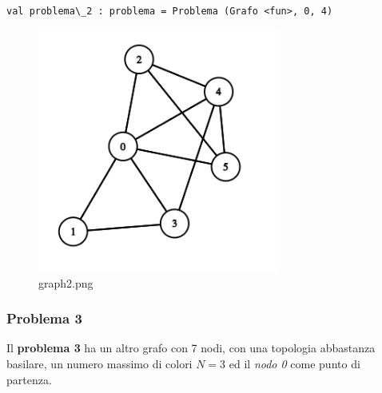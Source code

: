 \documentclass[11pt]{article}
\makeatletter
\newcommand{\boxspacing}{\kern\kvtcb@left@rule\kern\kvtcb@boxsep}
\newcommand{\prompt}[4]{
        {\ttfamily\llap{{\color{#2}[#3]:\hspace{3pt}#4}}\vspace{-\baselineskip}}
    }
\makeatother
\begin{document}
            \begin{tcolorbox}[breakable, size=fbox, boxrule=.5pt, pad at break*=1mm, opacityfill=0]
\prompt{Out}{outcolor}{5}{\boxspacing}
\begin{Verbatim}[commandchars=\\\{\}]
val problema\_2 : problema = Problema (Grafo <fun>, 0, 4)

\end{Verbatim}
\end{tcolorbox}
        
    \begin{figure}
\centering
\includegraphics[width=8cm, keepaspectratio]{Colored Camel_files/graph2.png}
\caption{graph2.png}
\end{figure}

    \hypertarget{problema-3}{%
\subsubsection{\texorpdfstring{Problema 3
}{Problema 3 }}\label{problema-3}}

    Il \textbf{problema 3} ha un altro grafo con 7 nodi, con una topologia
abbastanza basilare, un numero massimo di colori \(N = 3\) ed il
\emph{nodo 0} come punto di partenza.
\end{document}
